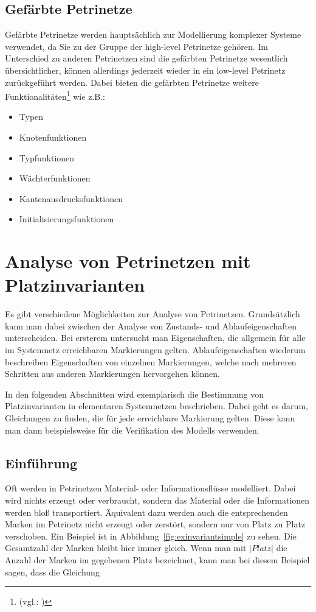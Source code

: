 	\subsection{Gefärbte Petrinetze}
		Gefärbte Petrinetze werden hauptsächlich zur Modellierung komplexer Systeme verwendet, da Sie zu der Gruppe der high-level Petrinetze gehören.
		Im Unterschied zu anderen Petrinetzen sind die gefärbten Petrinetze wesentlich übersichtlicher, können allerdings jederzeit wieder in ein low-level Petrinetz zurückgeführt werden.
		Dabei bieten die gefärbten Petrinetze weitere Funktionalitäten\footnote{(vgl.: \cite{tu_dresden:petrinetze})} wie z.B.:
		\begin{itemize}
		    \item Typen
		    \item Knotenfunktionen
		    \item Typfunktionen
		    \item Wächterfunktionen
		    \item Kantenausdrucksfunktionen
		    \item Initialisierungsfunktionen
		\end{itemize}
		
\section{Analyse von Petrinetzen mit Platzinvarianten}
	Es gibt verschiedene Möglichkeiten zur Analyse von Petrinetzen. Grundsätzlich kann man dabei zwischen der Analyse von Zustands- und Ablaufeigenschaften unterscheiden. Bei ersterem untersucht man Eigenschaften, die allgemein für alle im Systemnetz erreichbaren Markierungen gelten. Ablaufeigenschaften wiederum beschreiben Eigenschaften von einzelnen Markierungen, welche nach mehreren Schritten aus anderen Markierungen hervorgehen können.

	In den folgenden Abschnitten wird exemplarisch die Bestimmung von Platzinvarianten in elementaren Systemnetzen beschrieben. Dabei geht es darum, Gleichungen zu finden, die für jede erreichbare Markierung gelten. Diese kann man dann beispielsweise für die Verifikation des Modells verwenden.

	\subsection{Einführung}
	\label{sub:platzinvarianten_einf}
		Oft werden in Petrinetzen Material- oder Informationsflüsse modelliert. Dabei wird nichts erzeugt oder verbraucht, sondern das Material oder die Informationen werden bloß transportiert. Äquivalent dazu werden auch die entsprechenden Marken im Petrinetz nicht erzeugt oder zerstört, sondern nur von Platz zu Platz verschoben. Ein Beispiel ist in Abbildung~\ref{fig:exinvariantsimple} zu sehen. Die Gesamtzahl der Marken bleibt hier immer gleich. Wenn man mit $|Platz|$ die Anzahl der Marken im gegebenen Platz bezeichnet, kann man bei diesem Beispiel sagen, dass die Gleichung

